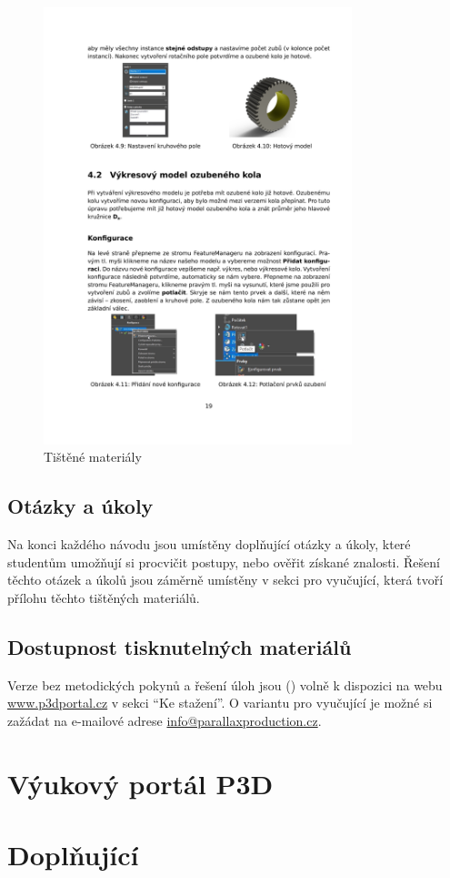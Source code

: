 \begin{figure}[htbp]
\begin{minipage}[b]{0.45\textwidth}
        \includegraphics[width=0.8\textwidth]{img/020/guide2.png}
        \caption{Tištěné materiály}
        \label{fig:thumb4}
    \end{minipage}
\end{figure}


\subsection{Otázky a úkoly}
Na konci každého návodu jsou umístěny doplňující otázky a úkoly, které studentům umožňují si procvičit postupy, nebo ověřit získané znalosti.
Řešení těchto otázek a úkolů jsou záměrně umístěny v sekci pro vyučující, která tvoří přílohu těchto tištěných materiálů.

\subsection{Dostupnost tisknutelných materiálů}
Verze bez metodických pokynů a řešení úloh jsou (\fxnote[inline=true]{\textcolor{red}{BUDOU}}) volně k dispozici na webu \href{https://www.p3dportal.cz}{www.p3dportal.cz} v sekci \enquote{Ke stažení}.
O variantu pro vyučující je možné si zažádat na e-mailové adrese \href{mailto:info@parallaxproduction.cz}{info@parallaxproduction.cz}.

\section{Výukový portál P3D}


\section{Doplňující }

